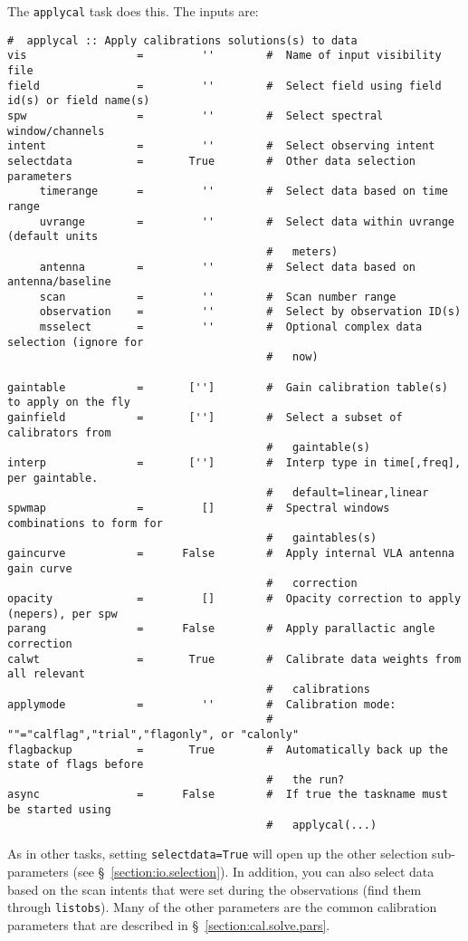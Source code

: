 The {\tt applycal} task does this.  The inputs are:
\small
\begin{verbatim}
#  applycal :: Apply calibrations solutions(s) to data
vis                 =         ''        #  Name of input visibility file
field               =         ''        #  Select field using field id(s) or field name(s)
spw                 =         ''        #  Select spectral window/channels
intent              =         ''        #  Select observing intent
selectdata          =       True        #  Other data selection parameters
     timerange      =         ''        #  Select data based on time range
     uvrange        =         ''        #  Select data within uvrange (default units
                                        #   meters)
     antenna        =         ''        #  Select data based on antenna/baseline
     scan           =         ''        #  Scan number range
     observation    =         ''        #  Select by observation ID(s)
     msselect       =         ''        #  Optional complex data selection (ignore for
                                        #   now)

gaintable           =       ['']        #  Gain calibration table(s) to apply on the fly
gainfield           =       ['']        #  Select a subset of calibrators from
                                        #   gaintable(s)
interp              =       ['']        #  Interp type in time[,freq], per gaintable.
                                        #   default=linear,linear
spwmap              =         []        #  Spectral windows combinations to form for
                                        #   gaintables(s)
gaincurve           =      False        #  Apply internal VLA antenna gain curve
                                        #   correction
opacity             =         []        #  Opacity correction to apply (nepers), per spw
parang              =      False        #  Apply parallactic angle correction
calwt               =       True        #  Calibrate data weights from all relevant
                                        #   calibrations
applymode           =         ''        #  Calibration mode:
                                        #   ""="calflag","trial","flagonly", or "calonly"
flagbackup          =       True        #  Automatically back up the state of flags before
                                        #   the run?
async               =      False        #  If true the taskname must be started using
                                        #   applycal(...)

\end{verbatim}
\normalsize
As in other tasks, setting {\tt selectdata=True} will open up the
other selection sub-parameters (see
\S~\ref{section:io.selection}). In addition, you can also select data
based on the scan intents that were set during the observations (find
them through {\tt listobs}). 
Many of the other parameters are the common calibration parameters
that are described in \S~\ref{section:cal.solve.pars}.

